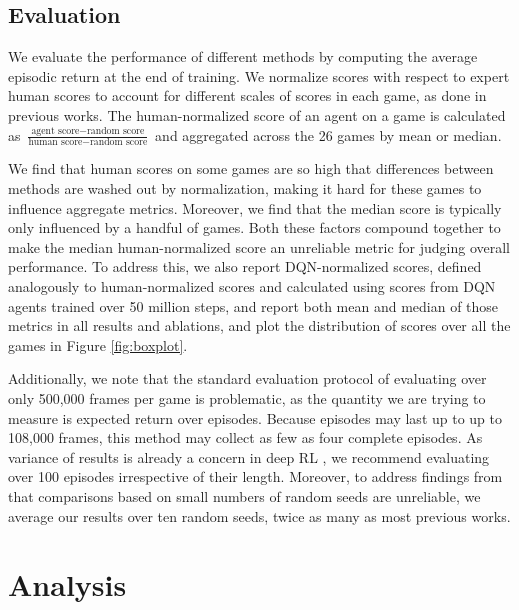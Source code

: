 \subsection{Evaluation}
We evaluate the performance of different methods by computing the average episodic return at the end of training. We normalize scores with respect to expert human scores to account for different scales of scores in each game, as done in previous works. The human-normalized score of an agent on a game is calculated as $\frac{\text{agent score} - \text{random score}}{\text{human score} - \text{random score}}$ and aggregated across the 26 games by mean or median.

We find that human scores on some games are so high that differences between methods are washed out by normalization, making it hard for these games to influence aggregate metrics.  Moreover, we find that the median score is typically only influenced by a handful of games.  Both these factors compound together to make the median human-normalized score an unreliable metric for judging overall performance.  To address this, we also report DQN-normalized scores, defined analogously to human-normalized scores and calculated using scores from DQN agents \citep{dqn} trained over 50 million steps, and report both mean and median of those metrics in all results and ablations, and plot the distribution of scores over all the games in Figure \ref{fig:boxplot}.

Additionally, we note that the standard evaluation protocol of evaluating over only 500,000 frames per game is problematic, as the quantity we are trying to measure is expected return over episodes.  Because episodes may last up to up to 108,000 frames, this method may collect as few as four complete episodes.  As variance of results is already a concern in deep RL \cite[see][]{drlthatmatters}, we recommend evaluating over 100 episodes irrespective of their length.  Moreover, to address findings from \cite{drlthatmatters} that comparisons based on small numbers of random seeds are unreliable, we average our results over ten random seeds, twice as many as most previous works.

\section{Analysis}

